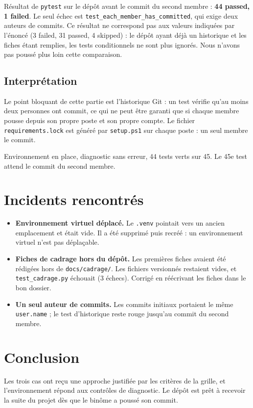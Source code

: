 \documentclass[11pt,a4paper]{article}
\begin{document}
Résultat de \texttt{pytest} sur le dépôt avant le commit du second membre : \textbf{44 passed, 1 failed}. Le seul échec est \texttt{test\_each\_member\_has\_committed}, qui exige deux auteurs de commits. Ce résultat ne correspond pas aux valeurs indiquées par l'énoncé (3 failed, 31 passed, 4 skipped) : le dépôt ayant déjà un historique et les fiches étant remplies, les tests conditionnels ne sont plus ignorés. Nous n'avons pas poussé plus loin cette comparaison.

\subsection{Interprétation}

Le point bloquant de cette partie est l'historique Git : un test vérifie qu'au moins deux personnes ont commit, ce qui ne peut être garanti que si chaque membre pousse depuis son propre poste et son propre compte. Le fichier \texttt{requirements.lock} est généré par \texttt{setup.ps1} sur chaque poste : un seul membre le commit.

\begin{reponse}
Environnement en place, diagnostic sans erreur, 44 tests verts sur 45. Le 45e test attend le commit du second membre.
\end{reponse}

\section{Incidents rencontrés}

\begin{itemize}[leftmargin=*]
  \item \textbf{Environnement virtuel déplacé.} Le \texttt{.venv} pointait vers un ancien emplacement et était vide. Il a été supprimé puis recréé : un environnement virtuel n'est pas déplaçable.
  \item \textbf{Fiches de cadrage hors du dépôt.} Les premières fiches avaient été rédigées hors de \texttt{docs/cadrage/}. Les fichiers versionnés restaient vides, et \texttt{test\_cadrage.py} échouait (3 échecs). Corrigé en réécrivant les fiches dans le bon dossier.
  \item \textbf{Un seul auteur de commits.} Les commits initiaux portaient le même \texttt{user.name} ; le test d'historique reste rouge jusqu'au commit du second membre.
\end{itemize}

\section*{Conclusion}

Les trois cas ont reçu une approche justifiée par les critères de la grille, et l'environnement répond aux contrôles de diagnostic. Le dépôt est prêt à recevoir la suite du projet dès que le binôme a poussé son commit.
\end{document}
